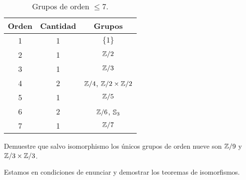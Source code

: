 \begin{table}[ht]
    \centering
    \begin{tabular}{|c|c|c|}
    \hline
    Orden & Cantidad & Grupos\\
    \hline
        1 & 1 & $\{1\}$ \\
        2 & 1 & $\mathbb{Z}/2$ \\
        3 & 1 & $\mathbb{Z}/3$ \\
        4 & 2 & $\mathbb{Z}/4$, $\mathbb{Z}/2\times\mathbb{Z}/2$ \\
        5 & 1 & $\mathbb{Z}/5$ \\
        6 & 2 & $\mathbb{Z}/6$, $\mathbb{S}_3$ \\
        7 & 1 & $\mathbb{Z}/7$ \\
    \hline
    \end{tabular}
    \caption{Grupos de orden $\leq7$.}
    \label{tab:grupos<8}
\end{table}

\begin{exercise}
\label{xca:size9}
Demuestre que salvo isomorphismo los únicos grupos de orden nueve son $\mathbb{Z}/9$ y $\mathbb{Z}/3\times\mathbb{Z}/3$. 
\end{exercise}

Estamos en condiciones de enunciar y demostrar los teoremas de isomorfismos. 


		
